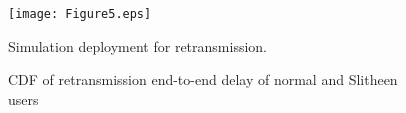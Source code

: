\documentclass[conference]{IEEEtran}
\begin{document}
\begin{figure}[htbp]
	\centerline{\texttt{[image: Figure5.eps]}}
	\caption{Simulation deployment for retransmission.}
	\label{fig}
\end{figure}

\begin{figure}[htbp]
	\centering
	\caption{CDF of retransmission end-to-end delay of normal and Slitheen users}
	\label{fig.lable}
\end{figure}
\end{document}
